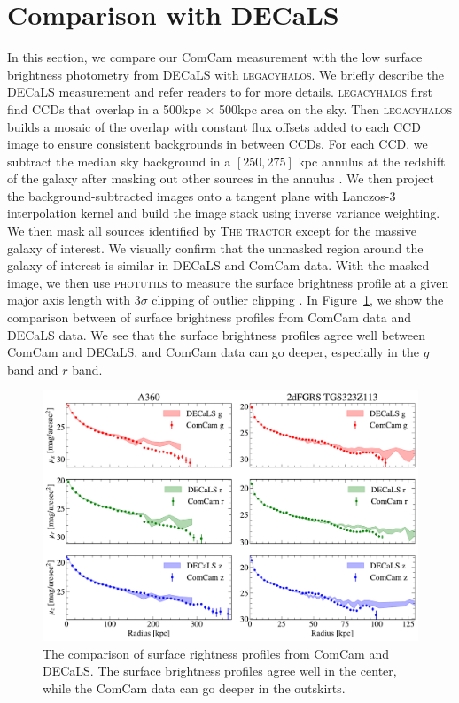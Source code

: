 \documentclass[SE,lsstdraft,authoryear,toc]{lsstdoc}
\newcommand{\lhalos}{\textsc{legacyhalos} }
\begin{document}
\section{Comparison with DECaLS}

In this section, we compare our ComCam measurement with the low surface brightness photometry from DECaLS with \textsc{legacyhalos}. We briefly describe the DECaLS measurement and refer readers to \cite{liReachingEdgeProbing2022,moustakasSienaGalaxyAtlas2023} for more details.  \lhalos first find CCDs that overlap in a 500kpc $\times$ 500kpc area on the sky. Then \lhalos builds a mosaic of the overlap with constant flux offsets added to each CCD image to ensure consistent backgrounds in between CCDs. For each CCD, we subtract the median sky background in a $[250, 275]$ kpc annulus at the redshift of the galaxy after masking out other sources in the annulus \citep{liReachingEdgeProbing2022}. We then project the background-subtracted images onto a tangent plane with Lanczos-3 interpolation kernel and build the image stack using inverse variance weighting. We then mask all sources identified by \textsc{The tractor} \citep{langTractorProbabilisticAstronomical2016} except for the massive galaxy of interest. We visually confirm that the unmasked region around the galaxy of interest is similar in DECaLS and ComCam data. With the masked image, we then use \textsc{photutils} to measure the surface brightness profile at a given major axis length with $3\sigma$ clipping of outlier clipping \citep{huangIndividualStellarHaloes2018, liReachingEdgeProbing2022}. In Figure~\ref{fig:comparison}, we show the comparison between of surface brightness profiles from ComCam data and DECaLS data. We see that the surface brightness profiles agree well between ComCam and DECaLS, and ComCam data can go deeper, especially in the $g$ band and $r$ band. 


\begin{figure}[!htbp]
  \centering
  \includegraphics[width=1.0\linewidth]{figures/comparison.pdf}
  \caption{The comparison of surface rightness profiles from ComCam and DECaLS. The surface brightness profiles agree well in the center, while the ComCam data can go deeper in the outskirts.}
  \label{fig:comparison}
\end{figure}
\end{document}
